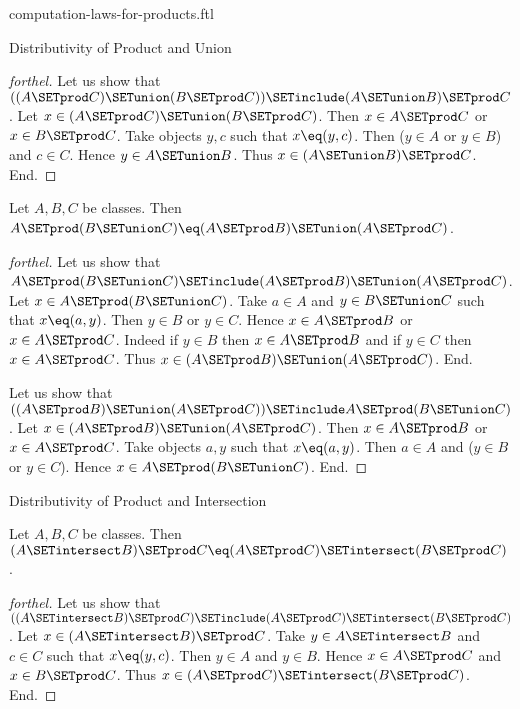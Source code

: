 \documentclass{naproche-library}
\begin{document}
\begin{smodule}[title=Computation Laws for Cartesian Products]{computation-laws-for-products.ftl}
\begin{sfragment}{Distributivity of Product and Union}
\begin{proof}[forthel]
    Let us show that $((A \SETprod C) \SETunion (B \SETprod C)) \SETinclude (A \SETunion B) \SETprod C$. %
      Let $x \in (A \SETprod C) \SETunion (B \SETprod C)$.
      Then $x \in A \SETprod C$ or $x \in B \SETprod C$.
      Take objects $y, c$ such that $x \eq (y, c)$.
      Then ($y \in A$ or $y \in B$) and $c \in C$.
      Hence $y \in A \SETunion B$.
      Thus $x \in (A \SETunion B) \SETprod C$.
    End.
  \end{proof}

  \begin{proposition}[forthel,id=FOUNDATIONS_05_476526841692160]
    Let $A, B, C$ be classes.
    Then $A \SETprod (B \SETunion C) \eq (A \SETprod B) \SETunion (A \SETprod C)$.
  \end{proposition}
  \begin{proof}[forthel]
    Let us show that $A \SETprod (B \SETunion C) \SETinclude (A \SETprod B) \SETunion (A \SETprod C)$.
      Let $x \in A \SETprod (B \SETunion C)$.
      Take $a \in A$ and $y \in B \SETunion C$ such that $x \eq (a, y)$.
      Then $y \in B$ or $y \in C$.
      Hence $x \in A \SETprod B$ or $x \in A \SETprod C$.
      Indeed if $y \in B$ then $x \in A \SETprod B$ and if $y \in C$ then $x \in A \SETprod C$.
      Thus $x \in (A \SETprod B) \SETunion (A \SETprod C)$.
    End.

    Let us show that $((A \SETprod B) \SETunion (A \SETprod C)) \SETinclude A \SETprod (B \SETunion C)$.
      Let $x \in (A \SETprod B) \SETunion (A \SETprod C)$.
      Then $x \in A \SETprod B$ or $x \in A \SETprod C$.
      Take objects $a, y$ such that $x \eq (a, y)$.
      Then $a \in A$ and ($y \in B$ or $y \in C$).
      Hence $x \in A \SETprod (B \SETunion C)$.
    End.
  \end{proof}
\end{sfragment}

\begin{sfragment}{Distributivity of Product and Intersection}
  \begin{proposition}[forthel,id=FOUNDATIONS_05_1249567930580992]
    Let $A, B, C$ be classes.
    Then $(A \SETintersect B) \SETprod C \eq (A \SETprod C) \SETintersect (B \SETprod C)$.
  \end{proposition}
  \begin{proof}[forthel]
    Let us show that $((A \SETintersect B) \SETprod C) \SETinclude (A \SETprod C) \SETintersect (B \SETprod C)$. %
      Let $x \in (A \SETintersect B) \SETprod C$.
      Take $y \in A \SETintersect B$ and $c \in C$ such that $x \eq (y, c)$.
      Then $y \in A$ and $y \in B$.
      Hence $x \in A \SETprod C$ and $x \in B \SETprod C$.
      Thus $x \in (A \SETprod C) \SETintersect (B \SETprod C)$.
    End.


\end{proof}
\end{sfragment}
\end{smodule}
\end{document}
